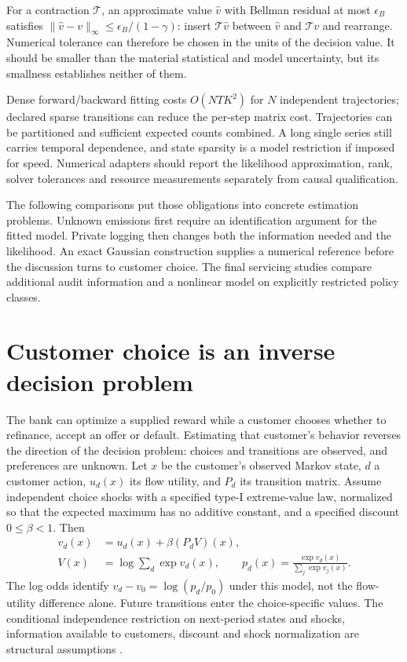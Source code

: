 For a contraction $\mathcal T$, an approximate value $\widehat v$
with Bellman residual at most $\epsilon_B$ satisfies
$\|\widehat v-v\|_\infty\le\epsilon_B/(1-\gamma)$: insert
$\mathcal T\widehat v$ between $\widehat v$ and $\mathcal Tv$
and rearrange. Numerical tolerance can therefore be chosen in the
units of the decision value. It should be smaller than the material
statistical and model uncertainty, but its smallness establishes
neither of them.

Dense forward/backward fitting costs $O(NTK^2)$ for $N$ independent
trajectories; declared sparse transitions can reduce the per-step
matrix cost. Trajectories can be partitioned and sufficient expected
counts combined. A long single series still carries temporal dependence,
and state sparsity is a model restriction if imposed for speed.
Numerical adapters should report the likelihood approximation, rank,
solver tolerances and resource measurements separately from causal
qualification.

The following comparisons put those obligations into concrete estimation
problems. Unknown emissions first require an identification argument for
the fitted model. Private logging then changes both the information needed
and the likelihood. An exact Gaussian construction supplies a numerical
reference before the discussion turns to customer choice. The final
servicing studies compare additional audit information and a nonlinear
model on explicitly restricted policy classes.





\section{Customer choice is an inverse decision problem}
\label{r3:customer-choice}
The bank can optimize a supplied reward while a customer chooses
whether to refinance, accept an offer or default. Estimating that
customer's behavior reverses the direction of the decision problem:
choices and transitions are observed, and preferences are unknown.
Let $x$ be the customer's observed Markov state, $d$ a customer
action, $u_d(x)$ its flow utility, and $P_d$ its transition matrix.
Assume independent choice shocks with a specified type-I extreme-value
law, normalized so that the expected maximum has no additive constant,
and a specified discount $0\le\beta<1$. Then
\begin{align}
 v_d(x)&=u_d(x)+\beta(P_dV)(x),\nonumber\\
 V(x)&=\log\sum_d\exp v_d(x),\qquad
 p_d(x)=\frac{\exp v_d(x)}{\sum_j\exp v_j(x)}.
 \label{r3:ddc-logit}
\end{align}
The log odds identify $v_d-v_0=\log(p_d/p_0)$ under this model,
not the flow-utility difference alone. Future transitions enter the
choice-specific values. The conditional independence restriction on
next-period states and shocks, information available to customers,
discount and shock normalization are structural assumptions
\citep[Section 2]{kalouptsidi2021}.

